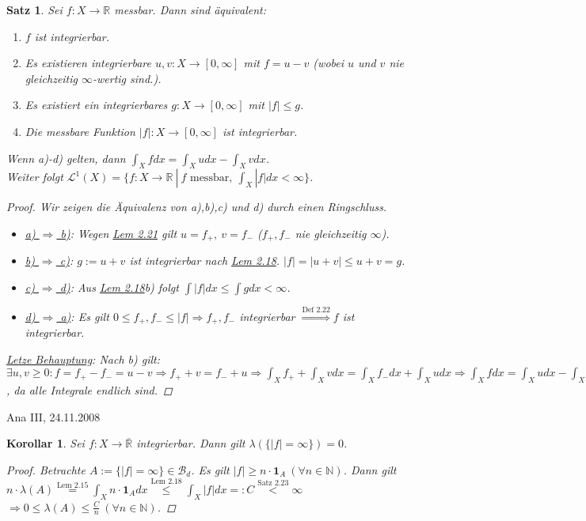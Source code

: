 \documentclass[a4paper]{scrreprt}
\newcommand{\doubleOne}{\textbf{1}}
\newcommand{\R}{\mathbb{R}}
\newcommand{\Rq}{\overline{\R}}
\newcommand{\N}{\mathbb{N}}
\newcommand{\Borel}{\mathcal{B}}
\newcommand{\Bd}{\Borel_d}
\newcommand{\Leb}{\mathcal{L}}
\newcommand{\jlabel}[1]{\label{j_#1}}
\newcommand{\jshortlink}[1]{\jhyperref{#1}{\text{#1}}}
\newcommand{\jhyperref}[2]{\hyperref[j_#1]{#2}}
\newcommand{\jlink}[1]{\jhyperref{#1}{#1}}
\newcommand{\jabb}[3]{ #1: #2 \rightarrow #3 }
\newcommand{\jspacesmall}{\vspace{4pt}}
\newcommand{\jdate}[1]{\jspacesmall\begin{center}\jlabel{#1}\tiny{Ana III, #1}\end{center}}
\theoremstyle{plain}
\newtheorem{satz}[thm]{Satz}
\newtheorem{kor}[thm]{Korollar}
\theoremstyle{definition}
\begin{document}
{{{\begin{satz}
\jlabel{Satz 2.23}
    Sei $\jabb{f}{X}{\R}$ messbar. Dann sind äquivalent:
    \begin{enumerate}
        \item $f$ ist integrierbar.
        \item Es existieren integrierbare $\jabb{u,v}{X}{[0,\infty]}$ mit $f=u-v$ (wobei $u$ und $v$ nie gleichzeitig $\infty$-wertig sind.).
        \item Es existiert ein integrierbares $\jabb{g}{X}{[0,\infty]}$ mit $|f| \le g$.
        \item Die messbare Funktion $\jabb{|f|}{X}{[0,\infty]}$ ist integrierbar.
    \end{enumerate}
    Wenn a)-d) gelten, dann $\int_X f dx = \int_X u dx - \int_X v dx$.\\
    Weiter folgt $\Leb^1(X) = \{\jabb{f}{X}{\R} \ | \ f \text{ messbar}, \ \int_X |f| dx < \infty\}$.
    \begin{proof}
        Wir zeigen die Äquivalenz von a),b),c) und d) durch einen Ringschluss.
        \begin{itemize}
            \item \uline{a) $\Rightarrow$ b)}: Wegen \jlink{Lem 2.21} gilt $u=f_+, \ v=f_-$ ($f_+,f_-$ nie gleichzeitig $\infty$).
            \item \uline{b) $\Rightarrow$ c)}: $g := u+v$ ist integrierbar nach \jlink{Lem 2.18}. $|f| = |u+v| \le u+v =g$.
            \item \uline{c) $\Rightarrow$ d)}: Aus \jlink{Lem 2.18}b) folgt $\int |f|dx \le \int g dx < \infty$.
            \item \uline{d) $\Rightarrow$ a)}: Es gilt $0 \le f_+,f_- \le |f| \Rightarrow f_+,f_-$ integrierbar $\overset{\jshortlink{Def 2.22}}{\Rightarrow} f$ ist integrierbar.
        \end{itemize}
        \uline{Letze Behauptung}: Nach b) gilt: $\exists u,v\ge 0: f=f_+-f_- = u-v \Rightarrow f_++v = f_-+u \Rightarrow \int_X f_+ + \int_X v dx = \int_X f_- dx + \int_X u dx \Rightarrow \int_X f dx = \int_X u dx - \int_X v dx$, da alle Integrale endlich sind.
    \end{proof}
\end{satz}

\jdate{24.11.2008}

{\begin{kor}
\jlabel{Kor 2.24}
    Sei $\jabb{f}{X}{\Rq}$ integrierbar. Dann gilt $\lambda(\{|f| = \infty\}) = 0$.
    \begin{proof}
        Betrachte $A:= \{|f| = \infty\} \in \Bd$. Es gilt $|f| \ge n\cdot \doubleOne_A \ (\forall n\in\N)$. Dann gilt $n\cdot \lambda(A) \overset{\jshortlink{Lem 2.15}}{=} \int_X n\cdot \doubleOne_A dx \overset{\jshortlink{Lem 2.18}}{\le} \int_X |f| dx =: C \overset{\jshortlink{Satz 2.23}}{<} \infty$\\
        $\Rightarrow 0 \le \lambda(A) \le \frac{C}{n} \ (\forall n\in\N)$.
    \end{proof}
\end{kor}

}}}}
\end{document}
